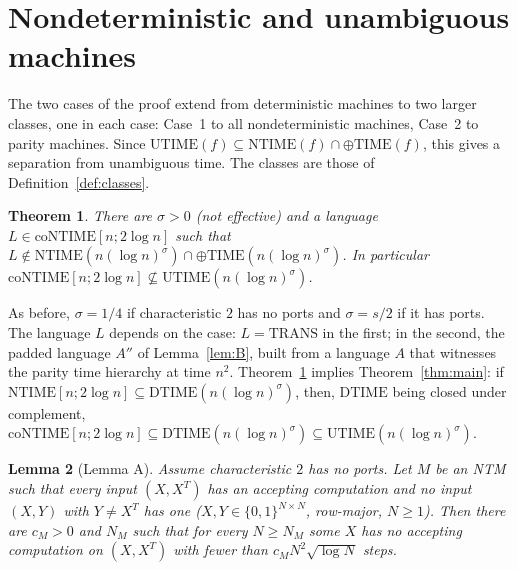 \documentclass[11pt]{article}
\newtheorem{theorem}{Theorem}[section]
\newtheorem{lemma}[theorem]{Lemma}
\theoremstyle{definition}
\theoremstyle{remark}
\newcommand{\DTIME}{\mathrm{DTIME}}
\newcommand{\NTIME}{\mathrm{NTIME}}
\newcommand{\coNTIME}{\mathrm{coNTIME}}
\newcommand{\parTIME}{\oplus\mathrm{TIME}}
\newcommand{\TRANS}{\mathrm{TRANS}}
\begin{document}
\section{Nondeterministic and unambiguous machines}\label{sec:utime}

The two cases of the proof extend from deterministic machines to two larger classes, one in each case: Case~1 to all
nondeterministic machines, Case~2 to parity machines. Since $\mathrm{UTIME}(f)\subseteq\NTIME(f)\cap\parTIME(f)$, this gives a
separation from unambiguous time. The classes are those of Definition~\ref{def:classes}.

\begin{theorem}\label{thm:Uplus}
There are $\sigma>0$ (not effective) and a language $L\in\coNTIME[n;2\log n]$ such that
$L\notin\NTIME(n(\log n)^{\sigma})\cap\parTIME(n(\log n)^{\sigma})$. In particular
$\coNTIME[n;2\log n]\not\subseteq\mathrm{UTIME}(n(\log n)^{\sigma})$.
\end{theorem}

As before, $\sigma=1/4$ if characteristic $2$ has no ports and $\sigma=s/2$ if it has ports. The language $L$ depends on the case:
$L=\TRANS$ in the first; in the second, the padded language $A''$ of Lemma~\ref{lem:B}, built from a language $A$ that witnesses
the parity time hierarchy at time $n^2$. Theorem~\ref{thm:Uplus} implies
Theorem~\ref{thm:main}: if $\NTIME[n;2\log n]\subseteq\DTIME(n(\log n)^{\sigma})$, then, $\DTIME$ being closed under complement,
$\coNTIME[n;2\log n]\subseteq\DTIME(n(\log n)^{\sigma})\subseteq\mathrm{UTIME}(n(\log n)^{\sigma})$.

\begin{lemma}[Lemma A]\label{lem:A}
Assume characteristic $2$ has no ports. Let $M$ be an NTM such that every input $(X,X^T)$ has an accepting computation and no input
$(X,Y)$ with $Y\ne X^T$ has one ($X,Y\in\{0,1\}^{N\times N}$, row-major, $N\ge1$). Then there are $c_M>0$ and $N_M$ such that for
every $N\ge N_M$ some $X$ has no accepting computation on $(X,X^T)$ with fewer than $c_MN^2\sqrt{\log N}$ steps.
\end{lemma}
\end{document}
